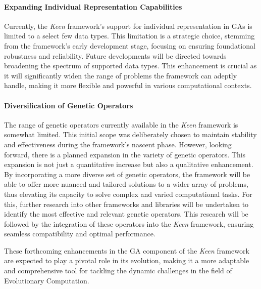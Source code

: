         \paragraph{Expanding Individual Representation Capabilities}
            Currently, the \textit{Keen} framework's support for individual representation in GAs is limited to a select 
            few data types. This limitation is a strategic choice, stemming from the framework's early development 
            stage, focusing on ensuring foundational robustness and reliability. Future developments will be directed 
            towards broadening the spectrum of supported data types. This enhancement is crucial as it will 
            significantly widen the range of problems the framework can adeptly handle, making it more flexible and 
            powerful in various computational contexts.

        \paragraph{Diversification of Genetic Operators}
            The range of genetic operators currently available in the \textit{Keen} framework is somewhat limited. This 
            initial scope was deliberately chosen to maintain stability and effectiveness during the framework's nascent 
            phase. However, looking forward, there is a planned expansion in the variety of genetic operators. This 
            expansion is not just a quantitative increase but also a qualitative enhancement. By incorporating a more 
            diverse set of genetic operators, the framework will be able to offer more nuanced and tailored solutions to 
            a wider array of problems, thus elevating its capacity to solve complex and varied computational tasks.
            For this, further research into other frameworks and libraries will be undertaken to identify the most 
            effective and relevant genetic operators. This research will be followed by the integration of these 
            operators into the \textit{Keen} framework, ensuring seamless compatibility and optimal performance.

        These forthcoming enhancements in the GA component of the \textit{Keen} framework are expected to play a pivotal 
        role in its evolution, making it a more adaptable and comprehensive tool for tackling the dynamic challenges in 
        the field of Evolutionary Computation.

